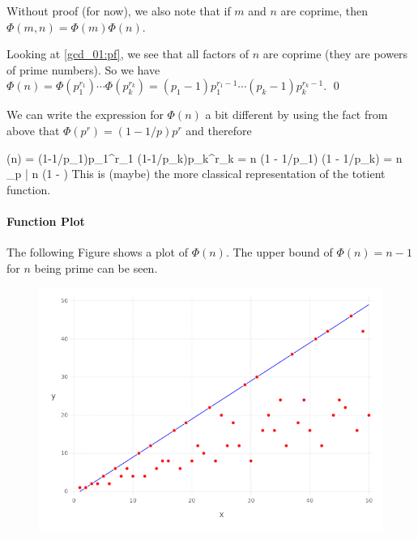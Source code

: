 Without proof (for now), we also note that if $m$ and $n$ are coprime, then $\Phi(m,n) = \Phi(m) \Phi(n)$.

Looking at \eqref{gcd_01:pf}, we see that all factors of $n$ are coprime (they are powers of prime numbers). So we have $\Phi(n) = \Phi(p_1^{r_1}) \cdots \Phi(p_k^{r_k}) = (p_1 - 1)p_1^{r_1-1} \cdots (p_k - 1)p_k^{r_k-1}$. \qed

We can write the expression for $\Phi(n)$ a bit different by using the fact from above that $\Phi(p^r) = (1-1/p)p^r$ and therefore

\bee
\Phi(n) = (1-1/p_1)p_1^{r_1} \cdots (1-1/p_k)p_k^{r_k} = n (1 - 1/p_1) \cdots (1 - 1/p_k) = n \prod_{p | n} \left(1 -  \right)
\eee
%
This is (maybe) the more classical representation of the totient function.

\paragraph{Function Plot}

The following Figure shows a plot of $\Phi(n)$. The upper bound of $\Phi(n) = n-1$ for $n$ being prime can be seen.

\begin{figure}[H]
\includegraphics[scale=0.5]{images/euler_phi.png}
\end{figure}

